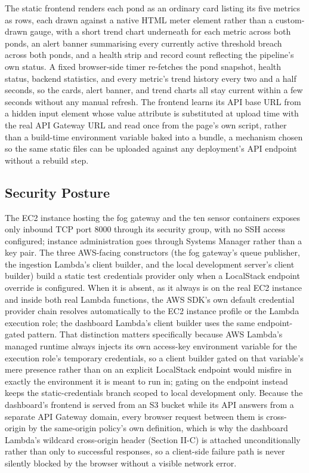 \documentclass[conference]{IEEEtran}
\begin{document}
The static frontend renders each pond as an ordinary card listing its five metrics as rows, each drawn against a native HTML meter element rather than a custom-drawn gauge, with a short trend chart underneath for each metric across both ponds, an alert banner summarising every currently active threshold breach across both ponds, and a health strip and record count reflecting the pipeline's own status. A fixed browser-side timer re-fetches the pond snapshot, health status, backend statistics, and every metric's trend history every two and a half seconds, so the cards, alert banner, and trend charts all stay current within a few seconds without any manual refresh. The frontend learns its API base URL from a hidden input element whose value attribute is substituted at upload time with the real API Gateway URL and read once from the page's own script, rather than a build-time environment variable baked into a bundle, a mechanism chosen so the same static files can be uploaded against any deployment's API endpoint without a rebuild step.

\subsection{Security Posture}

The EC2 instance hosting the fog gateway and the ten sensor containers exposes only inbound TCP port 8000 through its security group, with no SSH access configured; instance administration goes through Systems Manager rather than a key pair. The three AWS-facing constructors (the fog gateway's queue publisher, the ingestion Lambda's client builder, and the local development server's client builder) build a static test credentials provider only when a LocalStack endpoint override is configured. When it is absent, as it always is on the real EC2 instance and inside both real Lambda functions, the AWS SDK's own default credential provider chain resolves automatically to the EC2 instance profile or the Lambda execution role; the dashboard Lambda's client builder uses the same endpoint-gated pattern. That distinction matters specifically because AWS Lambda's managed runtime always injects its own access-key environment variable for the execution role's temporary credentials, so a client builder gated on that variable's mere presence rather than on an explicit LocalStack endpoint would misfire in exactly the environment it is meant to run in; gating on the endpoint instead keeps the static-credentials branch scoped to local development only. Because the dashboard's frontend is served from an S3 bucket while its API answers from a separate API Gateway domain, every browser request between them is cross-origin by the same-origin policy's own definition, which is why the dashboard Lambda's wildcard cross-origin header (Section II-C) is attached unconditionally rather than only to successful responses, so a client-side failure path is never silently blocked by the browser without a visible network error.
\end{document}
